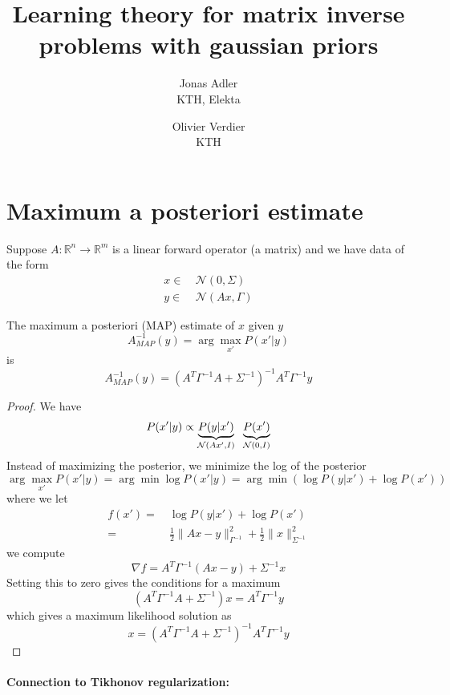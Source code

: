 \documentclass[a4paper,10pt]{article}
\title{Learning theory for matrix inverse problems with gaussian priors}
\author{Jonas Adler  \\ {\small KTH, Elekta} \and Olivier Verdier \\ {\small KTH}}
\date{}
\begin{document}
	\maketitle
	
\section{Maximum a posteriori estimate}

	Suppose $A : \mathbb{R}^n \to \mathbb{R}^m$ is a linear forward operator (a matrix) and we have data of the form
	\begin{align}
		x \in&\ \mathcal{N}(0, \Sigma) \nonumber \\
		y \in&\ \mathcal{N}(Ax, \Gamma) \label{eq:inv_prob}
	\end{align}	
	

  \begin{theorem}[{\cite[\S\,4.4]{Mu2012}}]
  	\label{prop:mapest}
	The maximum a posteriori (MAP) estimate of $x$ given $y$
	\[
	    A^{-1}_{MAP}(y) = \arg\max_{x'} P(x' | y)
	\]
	is
	\[
		A^{-1}_{MAP}(y) = (A^T \Gamma^{-1} A + \Sigma^{-1})^{-1} A^T \Gamma^{-1} y
	\]
\end{theorem}

	\begin{proof} We have
	\[
		P(x' | y) \propto \underbrace{P(y | x')}_{\mathcal{N}(Ax', I)} \hspace{2mm} \underbrace{P(x')}_{\mathcal{N}(0, I)} 
	\]
	Instead of maximizing the posterior, we minimize the log of the posterior
	\[
		\arg\max_{x'} P(x' | y) = \arg\min \log P(x' | y) = \arg\min \left( \log P(y | x') + \log P(x') \right)
	\]
	where we let
	\begin{align*}
		f(x') =&\ \log P(y | x') + \log P(x') \\
		=&\ \frac{1}{2} \| Ax - y \|_{\Gamma^{-1}}^2 + \frac{1}{2} \| x \|_{\Sigma^{-1}}^2
	\end{align*}
	we compute
	\[
		\nabla f = A^T \Gamma^{-1} (Ax - y) + \Sigma^{-1} x
	\]
	Setting this to zero gives the conditions for a maximum
	\[
		(A^T \Gamma^{-1} A + \Sigma^{-1}) x = A^T \Gamma^{-1} y
	\]
	which gives a maximum likelihood solution as
	\[
		x = (A^T \Gamma^{-1} A + \Sigma^{-1})^{-1} A^T \Gamma^{-1} y
	\]
\end{proof}

	\paragraph{Connection to Tikhonov regularization:}
	
\end{document}
